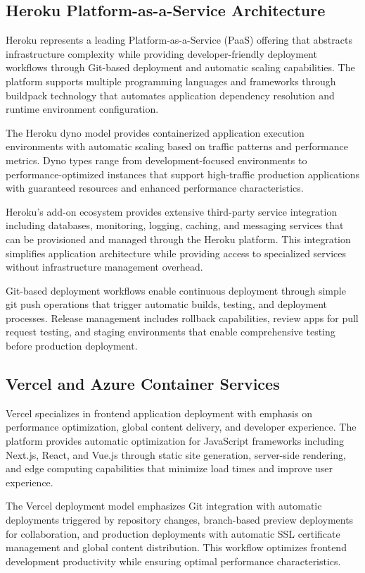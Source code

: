 \subsection{Heroku Platform-as-a-Service Architecture}

Heroku represents a leading Platform-as-a-Service (PaaS) offering that abstracts infrastructure complexity while providing developer-friendly deployment workflows through Git-based deployment and automatic scaling capabilities. The platform supports multiple programming languages and frameworks through buildpack technology that automates application dependency resolution and runtime environment configuration.

The Heroku dyno model provides containerized application execution environments with automatic scaling based on traffic patterns and performance metrics. Dyno types range from development-focused environments to performance-optimized instances that support high-traffic production applications with guaranteed resources and enhanced performance characteristics.

Heroku's add-on ecosystem provides extensive third-party service integration including databases, monitoring, logging, caching, and messaging services that can be provisioned and managed through the Heroku platform. This integration simplifies application architecture while providing access to specialized services without infrastructure management overhead.

Git-based deployment workflows enable continuous deployment through simple git push operations that trigger automatic builds, testing, and deployment processes. Release management includes rollback capabilities, review apps for pull request testing, and staging environments that enable comprehensive testing before production deployment.

\subsection{Vercel and Azure Container Services}

Vercel specializes in frontend application deployment with emphasis on performance optimization, global content delivery, and developer experience. The platform provides automatic optimization for JavaScript frameworks including Next.js, React, and Vue.js through static site generation, server-side rendering, and edge computing capabilities that minimize load times and improve user experience.

The Vercel deployment model emphasizes Git integration with automatic deployments triggered by repository changes, branch-based preview deployments for collaboration, and production deployments with automatic SSL certificate management and global content distribution. This workflow optimizes frontend development productivity while ensuring optimal performance characteristics.

